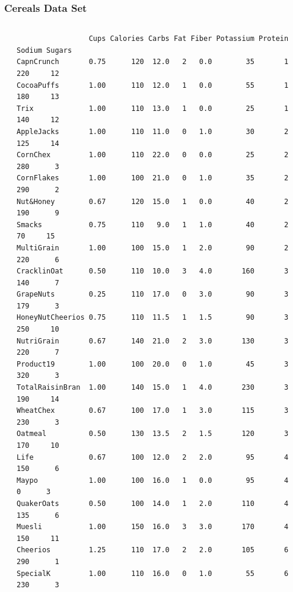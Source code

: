 \documentclass[12pt]{beamer}\usepackage[]{graphicx}\usepackage[]{color}
\makeatletter
\newenvironment{kframe}{%
 \def\at@end@of@kframe{}%
 \ifinner\ifhmode%
  \def\at@end@of@kframe{\end{minipage}}%
  \begin{minipage}{\columnwidth}%
 \fi\fi%
 \def\FrameCommand##1{\hskip\@totalleftmargin \hskip-\fboxsep
 \colorbox{shadecolor}{##1}\hskip-\fboxsep
     \hskip-\linewidth \hskip-\@totalleftmargin \hskip\columnwidth}%
 \MakeFramed {\advance\hsize-\width
   \@totalleftmargin\z@ \linewidth\hsize
   \@setminipage}}%
 {\par\unskip\endMakeFramed%
 \at@end@of@kframe}
\newenvironment{knitrout}{}{} %
\makeatother
\begin{document}
\begin{frame}[fragile]
\frametitle{Cereals Data Set}

\begin{columns}[t]
\begin{column}{0.1\textwidth}
\end{column}
\begin{column}{0.8\textwidth}
\begin{knitrout}\tiny
{}\color{fgcolor}\begin{kframe}
\begin{verbatim}
                 Cups Calories Carbs Fat Fiber Potassium Protein Sodium Sugars
CapnCrunch       0.75      120  12.0   2   0.0        35       1    220     12
CocoaPuffs       1.00      110  12.0   1   0.0        55       1    180     13
Trix             1.00      110  13.0   1   0.0        25       1    140     12
AppleJacks       1.00      110  11.0   0   1.0        30       2    125     14
CornChex         1.00      110  22.0   0   0.0        25       2    280      3
CornFlakes       1.00      100  21.0   0   1.0        35       2    290      2
Nut&Honey        0.67      120  15.0   1   0.0        40       2    190      9
Smacks           0.75      110   9.0   1   1.0        40       2     70     15
MultiGrain       1.00      100  15.0   1   2.0        90       2    220      6
CracklinOat      0.50      110  10.0   3   4.0       160       3    140      7
GrapeNuts        0.25      110  17.0   0   3.0        90       3    179      3
HoneyNutCheerios 0.75      110  11.5   1   1.5        90       3    250     10
NutriGrain       0.67      140  21.0   2   3.0       130       3    220      7
Product19        1.00      100  20.0   0   1.0        45       3    320      3
TotalRaisinBran  1.00      140  15.0   1   4.0       230       3    190     14
WheatChex        0.67      100  17.0   1   3.0       115       3    230      3
Oatmeal          0.50      130  13.5   2   1.5       120       3    170     10
Life             0.67      100  12.0   2   2.0        95       4    150      6
Maypo            1.00      100  16.0   1   0.0        95       4      0      3
QuakerOats       0.50      100  14.0   1   2.0       110       4    135      6
Muesli           1.00      150  16.0   3   3.0       170       4    150     11
Cheerios         1.25      110  17.0   2   2.0       105       6    290      1
SpecialK         1.00      110  16.0   0   1.0        55       6    230      3
\end{verbatim}
\end{kframe}
\end{knitrout}
\end{column}
\begin{column}{0.1\textwidth}
\end{column}
\end{columns}

\end{frame}
\end{document}
